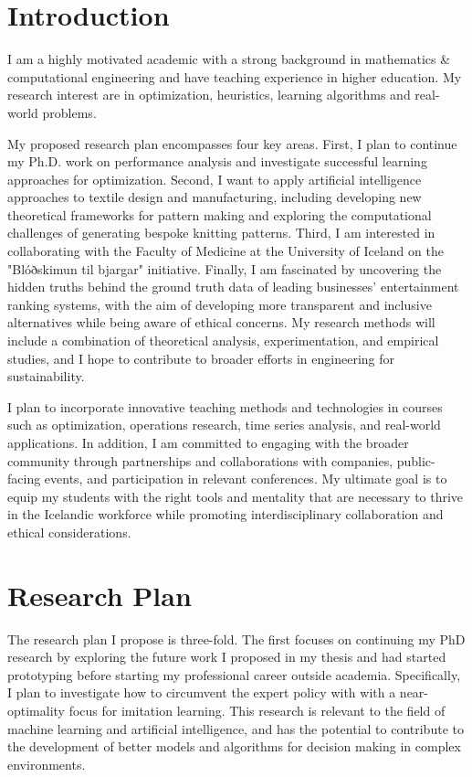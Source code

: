 \documentclass[]{cv} %
\begin{document}
	
\removeaside

\section{Introduction}
I am a highly motivated academic with a strong background in mathematics \& computational engineering and have teaching experience in higher education. My research interest are in optimization, heuristics, learning algorithms and real-world problems.

My proposed research plan encompasses four key areas. First, I plan to continue my Ph.D. work on performance analysis and investigate successful learning approaches for optimization. Second, I want to apply artificial intelligence approaches to textile design and manufacturing, including developing new theoretical frameworks for pattern making and exploring the computational challenges of generating bespoke knitting patterns. Third, I am interested in collaborating with the Faculty of Medicine at the University of Iceland on the "Blóðskimun til bjargar" initiative. Finally, I am fascinated by uncovering the hidden truths behind the ground truth data of leading businesses' entertainment ranking systems, with the aim of developing more transparent and inclusive alternatives while being aware of ethical concerns. My research methods will include a combination of theoretical analysis, experimentation, and empirical studies, and I hope to contribute to broader efforts in engineering for sustainability.

I plan to incorporate innovative teaching methods and technologies in courses such as optimization, operations research, time series analysis, and real-world applications. In addition, I am committed to engaging with the broader community through partnerships and collaborations with companies, public-facing events, and participation in relevant conferences. My ultimate goal is to equip my students with the right tools and mentality that are necessary to thrive in the Icelandic workforce while promoting interdisciplinary collaboration and ethical considerations.


\section{Research Plan}
The research plan I propose is three-fold. The first focuses on continuing my PhD research by exploring the future work I proposed in my thesis and had started prototyping before starting my professional career outside academia. Specifically, I plan to investigate how to circumvent the expert policy with with a near-optimality focus for imitation learning. This research is relevant to the field of machine learning and artificial intelligence, and has the potential to contribute to the development of better models and algorithms for decision making in complex environments.
\end{document}
